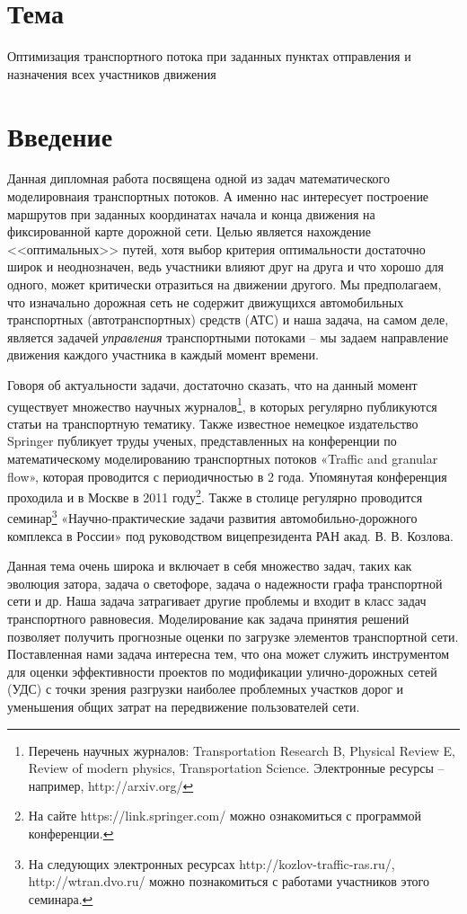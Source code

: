 \documentclass[12pt, a4paper]{article}
\begin{document}
	\section*{Тема}
	Оптимизация транспортного потока при заданных пунктах отправления и назначения всех участников движения
	
	\section*{Введение}
	
	Данная дипломная работа посвящена одной из задач математического моделировнаия транспортных потоков. А именно нас интересует построение маршрутов при заданных координатах начала и конца движения на фиксированной карте дорожной сети. Целью является нахождение <<оптимальных>> путей, хотя выбор критерия оптимальности достаточно широк и неоднозначен, ведь участники влияют друг на друга и что хорошо для одного, может критически отразиться на движении другого. Мы предполагаем, что изначально дорожная сеть не содержит движущихся автомобильных транспортных (автотранспортных) средств (АТС) и наша задача, на самом деле, является задачей \textit{управления} транспортными потоками -- мы задаем направление движения каждого участника в каждый момент времени.
	
	
	
	Говоря об актуальности задачи, достаточно сказать, что на данный момент существует множество научных журналов\footnote{Перечень научных журналов: Transportation Research B, Physical Review E, Review of modern physics, Transportation Science. Электронные ресурсы -- например, http://arxiv.org/}, в которых регулярно публикуются статьи на транспортную тематику. Также известное немецкое издательство Springer публикует труды ученых, представленных на конференции по математическому моделированию транспортных потоков «Traffic and granular flow», которая проводится с периодичностью в 2 года. Упомянутая конференция проходила и в Москве в 2011 году\footnote{На сайте https://link.springer.com/ можно ознакомиться с программой конференции.}. Также в столице регулярно проводится семинар\footnote{На следующих электронных ресурсах http://kozlov-traffic-ras.ru/, http://wtran.dvo.ru/ можно познакомиться с работами участников этого семинара.} «Научно-практические задачи развития автомобильно-дорожного комплекса в России» под руководством вицепрезидента РАН акад. В. В. Козлова.
	
	Данная тема очень широка и включает в себя множество задач, таких как эволюция затора, задача о светофоре, задача о надежности графа транспортной сети и др. Наша задача затрагивает другие проблемы и входит в класс задач транспортного равновесия. Моделирование как задача принятия решений позволяет получить прогнозные оценки по загрузке элементов транспортной сети. Поставленная нами задача интересна тем, что она может служить инструментом для оценки эффективности проектов по модификации улично-дорожных сетей (УДС) с точки зрения разгрузки наиболее проблемных участков дорог и уменьшения общих затрат на передвижение пользователей сети.
	
\end{document}
